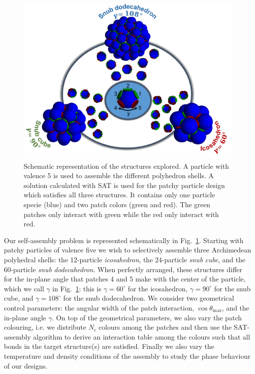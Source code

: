 \documentclass[a4paper, amsfonts, amssymb, amsmath, reprint, showkeys, nofootinbib, twoside]{revtex4-1}
\begin{document}
\begin{figure}[t]
	\includegraphics{fig1.pdf}
	\caption{\label{SAT} Schematic representation of the structures explored. A particle with valence 5 is used to assemble the different polyhedron shells. A solution calculated with SAT is used for the patchy particle design which satisfies all three structures. It contains only one particle specie (blue) and two patch colors (green and red). The green patches only interact with green while the red only interact with red.}
\end{figure}


Our self-assembly problem is represented schematically in Fig.~\ref{SAT}. Starting with patchy particles of valence five we wish to selectively assemble three Archimedean polyhedral shells: the 12-particle \emph{icosahedron}, the 24-particle \emph{snub cube}, and the 60-particle \emph{snub dodecahedron}. When perfectly arranged, these structures differ for the in-plane angle that patches 4 and 5 make with the center of the particle, which we call $\gamma$ in Fig.~\ref{SAT}: this is $\gamma=60^\circ$ for the icosahedron, $\gamma=90^\circ$ for the snub cube, and  $\gamma=108^\circ$ for the snub dodecahedron. We consider two geometrical control parameters: the angular width of the patch interaction, $\cos\theta_\text{max}$, and the in-plane angle $\gamma$. On top of the geometrical parameters, we also vary the patch colouring, i.e. we distribute $N_c$ colours among the patches and then use the SAT-assembly algorithm to derive an interaction table among the colours such that all bonds in the target structure(s) are satisfied. Finally we also vary the temperature and density conditions of the assembly to study the phase behaviour of our designs.
\end{document}
